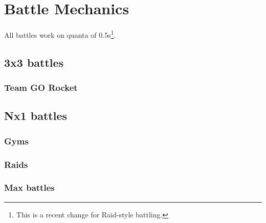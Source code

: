 \chapter{Battle Mechanics}
\label{chap:battle}
All battles work on quanta of 0.5s\footnote{This is a recent change for Raid-style battling.}.

\section{3x3 battles}
\label{section:3x3}

\subsection{Team GO Rocket}
\label{section:rocket}

\section{Nx1 battles}
\label{section:nx1}

\subsection{Gyms}
\label{section:gyms}

\subsection{Raids}
\label{section:raids}

\subsection{Max battles}
\label{section:maxbattles}

